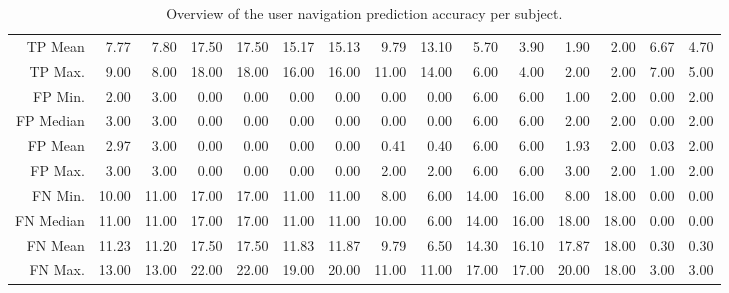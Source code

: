 \begin{table}[ht]
\begin{tabular}{rrrrrrrrrrrrrrr}
  TP Mean & 7.77 & 7.80 & 17.50 & 17.50 & 15.17 & 15.13 & 9.79 & 13.10 & 5.70 & 3.90 & 1.90 & 2.00 & 6.67 & 4.70 \\ 
  TP Max. & 9.00 & 8.00 & 18.00 & 18.00 & 16.00 & 16.00 & 11.00 & 14.00 & 6.00 & 4.00 & 2.00 & 2.00 & 7.00 & 5.00 \\ 
  FP Min. & 2.00 & 3.00 & 0.00 & 0.00 & 0.00 & 0.00 & 0.00 & 0.00 & 6.00 & 6.00 & 1.00 & 2.00 & 0.00 & 2.00 \\ 
  FP Median & 3.00 & 3.00 & 0.00 & 0.00 & 0.00 & 0.00 & 0.00 & 0.00 & 6.00 & 6.00 & 2.00 & 2.00 & 0.00 & 2.00 \\ 
  FP Mean & 2.97 & 3.00 & 0.00 & 0.00 & 0.00 & 0.00 & 0.41 & 0.40 & 6.00 & 6.00 & 1.93 & 2.00 & 0.03 & 2.00 \\ 
  FP Max. & 3.00 & 3.00 & 0.00 & 0.00 & 0.00 & 0.00 & 2.00 & 2.00 & 6.00 & 6.00 & 3.00 & 2.00 & 1.00 & 2.00 \\ 
  FN Min. & 10.00 & 11.00 & 17.00 & 17.00 & 11.00 & 11.00 & 8.00 & 6.00 & 14.00 & 16.00 & 8.00 & 18.00 & 0.00 & 0.00 \\ 
  FN Median & 11.00 & 11.00 & 17.00 & 17.00 & 11.00 & 11.00 & 10.00 & 6.00 & 14.00 & 16.00 & 18.00 & 18.00 & 0.00 & 0.00 \\ 
  FN Mean & 11.23 & 11.20 & 17.50 & 17.50 & 11.83 & 11.87 & 9.79 & 6.50 & 14.30 & 16.10 & 17.87 & 18.00 & 0.30 & 0.30 \\ 
  FN Max. & 13.00 & 13.00 & 22.00 & 22.00 & 19.00 & 20.00 & 11.00 & 11.00 & 17.00 & 17.00 & 20.00 & 18.00 & 3.00 & 3.00 \\ 
   \hline
\end{tabular}
\caption{Overview of the user navigation prediction accuracy per subject.} 
\label{tab:results:rq4:summary:subject}
\end{table}
